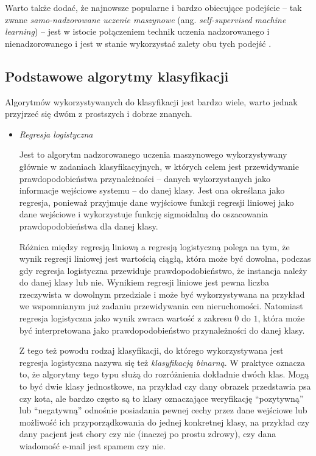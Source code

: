 Warto także dodać, że najnowsze popularne i bardzo obiecujące podejście -- tak zwane \emph{samo-nadzorowane uczenie maszynowe} (ang. \emph{self-supervised machine learning}) -- jest w istocie połączeniem technik uczenia nadzorowanego i nienadzorowanego i jest w stanie wykorzystać zalety obu tych podejść \cite{krishnan2022self}.

\subsection{Podstawowe algorytmy klasyfikacji}

Algorytmów wykorzystywanych do klasyfikacji jest bardzo wiele, warto jednak przyjrzeć się dwóm z prostszych i dobrze znanych.

\begin{itemize}

  \item \emph{Regresja logistyczna}

        Jest to algorytm nadzorowanego uczenia maszynowego wykorzystywany głównie w zadaniach klasyfikacyjnych, w których celem jest przewidywanie prawdopodobieństwa przynależności  -- danych wykorzystanych jako informacje wejściowe systemu -- do danej klasy.
        Jest ona określana jako regresja, ponieważ przyjmuje dane wyjściowe funkcji regresji liniowej jako dane wejściowe i wykorzystuje funkcję sigmoidalną do oszacowania prawdopodobieństwa dla danej klasy.

        Różnica między regresją liniową a regresją logistyczną polega na tym, że wynik regresji liniowej jest wartością ciągłą, która może być dowolna, podczas gdy regresja logistyczna przewiduje prawdopodobieństwo, że instancja należy do danej klasy lub nie.
        Wynikiem regresji liniowe jest pewna liczba rzeczywista w dowolnym przedziale i może być wykorzystywana na przykład we wspomnianym już zadaniu przewidywania cen nieruchomości.
        Natomiast regresja logistyczna jako wynik zwraca wartość z zakresu $0$ do $1$, która może być interpretowana jako prawdopodobieństwo przynależności do danej klasy.

        Z tego też powodu rodzaj klasyfikacji, do którego wykorzystywana jest regresja logistyczna nazywa się też \emph{klasyfikacją binarną}.
        W praktyce oznacza to, że algorytmy tego typu służą do rozróżnienia dokładnie dwóch klas.
        Mogą to być dwie klasy jednostkowe, na przykład czy dany obrazek przedstawia psa czy kota, ale bardzo często są to klasy oznaczające weryfikację ``pozytywną'' lub ``negatywną'' odnośnie posiadania pewnej cechy przez dane wejściowe lub możliwość ich przyporządkowania do jednej konkretnej klasy, na przykład czy dany pacjent jest chory czy nie (inaczej po prostu zdrowy), czy dana wiadomość e-mail jest spamem czy nie.


\end{itemize}
